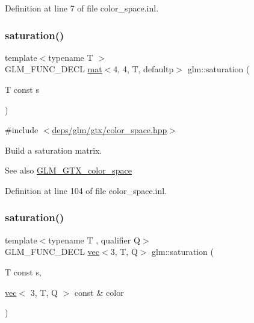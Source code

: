 Definition at line 7 of file color\+\_\+space.\+inl.

\mbox{\label{group__gtx__color__space_ga01a97152b44e1550edcac60bd849e884}} 
\subsubsection{\texorpdfstring{saturation()}{saturation()}\hspace{0.1cm}{\footnotesize\ttfamily [1/3]}}
{\footnotesize\ttfamily template$<$typename T $>$ \\
G\+L\+M\+\_\+\+F\+U\+N\+C\+\_\+\+D\+E\+CL \hyperlink{structglm_1_1mat}{mat}$<$4, 4, T, defaultp$>$ glm\+::saturation (\begin{DoxyParamCaption}\item[{T const}]{s }\end{DoxyParamCaption})}



{\ttfamily \#include $<$\hyperlink{gtx_2color__space_8hpp}{deps/glm/gtx/color\+\_\+space.\+hpp}$>$}

Build a saturation matrix. \begin{DoxySeeAlso}{See also}
\hyperlink{group__gtx__color__space}{G\+L\+M\+\_\+\+G\+T\+X\+\_\+color\+\_\+space} 
\end{DoxySeeAlso}


Definition at line 104 of file color\+\_\+space.\+inl.

\mbox{\label{group__gtx__color__space_ga2156cea600e90148ece5bc96fd6db43a}} 
\subsubsection{\texorpdfstring{saturation()}{saturation()}\hspace{0.1cm}{\footnotesize\ttfamily [2/3]}}
{\footnotesize\ttfamily template$<$typename T , qualifier Q$>$ \\
G\+L\+M\+\_\+\+F\+U\+N\+C\+\_\+\+D\+E\+CL \hyperlink{structglm_1_1vec}{vec}$<$3, T, Q$>$ glm\+::saturation (\begin{DoxyParamCaption}\item[{T const}]{s,  }\item[{\hyperlink{structglm_1_1vec}{vec}$<$ 3, T, Q $>$ const \&}]{color }\end{DoxyParamCaption})}



